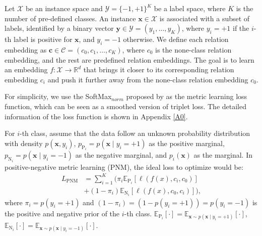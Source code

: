 \documentclass[11pt]{article}
\begin{document}
Let $\mathcal{X}$ be an instance space and $\mathcal{Y}=\{-1,+1\}^{K}$ be a label space, where $K$ is the number of pre-defined classes. An instance $\boldsymbol{x} \in \mathcal{X}$ is associated with a subset of labels, identified by a binary vector $\boldsymbol{y} \in \mathcal{Y}=\left(y_{1}, \ldots, y_{K}\right)$, where $y_{i}=+1$ if the $i$-th label is positive for $\boldsymbol{x}$, and $y_{i}=-1$ otherwise. We define each relation embedding as $\boldsymbol{c} \in \mathcal{C}=\left(c_{0}, c_{1}, \ldots, c_{K}\right)$, where $c_{0}$ is the none-class relation embedding, and the rest are predefined relation embeddings. The goal is to learn an embedding $f : \mathcal{X} \rightarrow \mathbb{R}^d$ that brings it closer to its corresponding relation embedding $c_{i}$ and push it further away from the none-class relation embedding $c_{0}$. 

For simplicity, we use the SoftMax$_{norm}$ proposed by \citep{qian2019softtriple} as the metric learning loss function, which can be seen as a smoothed version of triplet loss. The detailed information of the loss function is shown in Appendix \ref{A0}.

For $i$-th class, assume that the data follow an unknown probability distribution with density $p(\boldsymbol{x}, y_{i})$, $p_{\mathrm{P}_{i}}=p(\boldsymbol{x} \mid y_{i}=+1)$ as the positive marginal, $p_{\mathrm{N}_{i}}=p(\boldsymbol{x} \mid y_{i}=-1)$ as the negative marginal, and $p_{i}(\boldsymbol{x})$ as the marginal. In positive-negative metric learning (PNM), the ideal loss to optimize would be:
\begin{equation}
\begin{aligned}\label{eq3}
L_{\mathrm{PNM}}&=\sum_{i=1}^{K}(\pi_{i} \mathbb{E}_{\mathrm{P}_{i}}[\ell(f(x), c_{i}, c_{0})]\\&+(1-\pi_{i})\mathbb{E}_{\mathrm{N}_{i}}[\ell(f(x), c_{0}, c_{i})]),
\end{aligned}
\end{equation}
where $\pi_{i}=p(y_{i}=+1)$ and $(1-\pi_{i})=(1-p(y_{i}=+1))=p(y_{i}=-1)$ is the positive and negative prior of the $i$-th class. $\mathbb{E}_{\mathrm{P}_{i}}[\cdot]=\mathbb{E}_{\boldsymbol{x} \sim p(\boldsymbol{x} \mid y_{i}=+1)}[\cdot]$, $\mathbb{E}_{\mathrm{N}_{i}}[\cdot]=\mathbb{E}_{\boldsymbol{x} \sim p(\boldsymbol{x} \mid y_{i}=-1)}[\cdot]$. 
\end{document}
